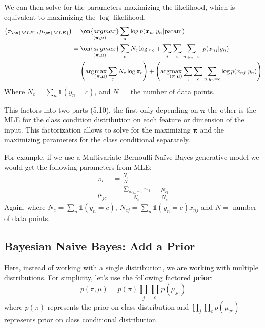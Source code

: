 \documentclass{article}
\renewcommand{\v}{\boldsymbol}
\begin{document}
\smallskip

We can then solve for the parameters maximizing the likelihood, which is equivalent to maximizing the $\log$ likelihood.
\begin{align}
		\left(\pi_{\on{MLE}}, \mu_{\on{MLE}}\right) &= \underset{(\v \pi,\v \mu)}{\on{argmax}} \sum_n \log p(\v x_n , y_n| \text{param})\\
		&= \underset{(\v \pi,\v \mu)}{\on{argmax}} \sum_c N_c \log \pi_c + \sum_i\sum_c\sum_{n:y_n=c}\  p(x_{nj}|y_n)\\
	    &= \left(\arg\!\max_{(\v \pi,\v \mu)} \sum_c N_c \log \pi_c\right) + \left(\arg\!\max_{(\v \pi,\v \mu)} \sum_i\sum_c\sum_{n:y_n=c}\log p(x_{nj}|y_n)\right)
\end{align}
Where $N_c = \sum_n \mathbb{1}(y_n = c)$, and $N =$ the number of data points.

\smallskip

This factors into two parts (5.10), the first only depending on $\v\pi$ the other is the MLE for the class condition distribution on each feature or dimension of the input. This factorization allows to solve for the maximizing $\v\pi$ and the maximizing parameters for the class conditional separately.

\smallskip

For example, if we use a Multivariate Bernoulli Na\"ive Bayes generative model we would get the following parameters from MLE:
\begin{align}
		\pi_c &= \frac{N_c}{N}\\
		\mu_{jc} &= \frac{\sum_{n:y_n=c}x_{nj}}{N_c} = \frac{N_{cj}}{N_c}
\end{align}
Again, where $N_c = \sum_n \mathbb{1}(y_n = c)$, $N_{cj} = \sum_n \mathbb{1}(y_n = c) x_{nj}$ and $N =$ number of data points.\\
\subsection{Bayesian Naive Bayes: Add a Prior}
Here, instead of working with a single distribution, we are working with multiple distributions. For simplicity, let's use the following factored \textbf{prior}:
\[p(\pi, \mu) = p(\pi) \prod_j \prod_c p(\mu_{jc})\] 
where $p(\pi)$ represents the prior on class distribution and $\prod_j \prod_c p(\mu_{jc})$ represents prior on class conditional distribution.

\smallskip
\end{document}
